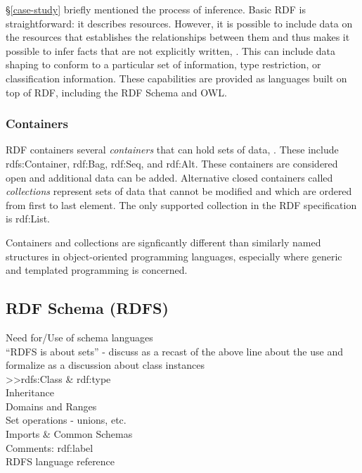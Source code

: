 \S \ref{case-study} briefly mentioned the process of inference. Basic RDF is
straightforward: it describes resources. However, it is possible to include data
on the resources that establishes the relationships between them and thus makes
it possible to infer facts that are not explicitly written,
\cite{allemang_semantic_2008}. This can include data shaping to conform to a
particular set of information, type restriction, or classification information.
These capabilities are provided as languages built on top of RDF, including the
RDF Schema and OWL.


\subsubsection{Containers}

RDF containers several \textit{containers} that can hold sets of data,
\cite{rdf-syntax}. These include rdfs:Container, rdf:Bag, rdf:Seq, and rdf:Alt.
These containers are considered open and additional data can be added.
Alternative closed containers called \textit{collections} represent sets of data
that cannot be modified and which are ordered from first to last element. The
only supported collection in the RDF specification is rdf:List.

Containers and collections are signficantly different than similarly named
structures in object-oriented programming languages, especially where generic
and templated programming is concerned.

\subsection{RDF Schema (RDFS)}

Need for/Use of schema languages\\
``RDFS is about sets'' - discuss as a recast of the above line about the use and
formalize as a discussion about class instances\\
>>rdfs:Class \& rdf:type\\
Inheritance\\
Domains and Ranges\\
Set operations - unions, etc.\\
Imports \& Common Schemas\\
Comments: rdf:label\\
RDFS language reference\\

